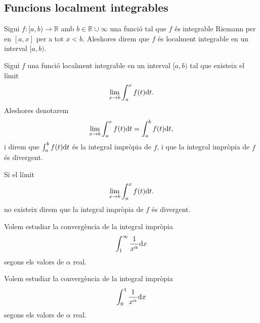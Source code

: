 \documentclass[../Apunts.tex]{subfiles}
\begin{document}
	\subsection{Funcions localment integrables}
	\begin{definition}
		\label{def:funció localment integrable}
		Sigui \(f\colon[a,b)\longrightarrow\mathbb{R}\) amb \(b\in\mathbb{R}\cup\infty\) una funció tal que \(f\) és integrable Riemann per en \([a,x]\) per a tot \(x<b\). Aleshores direm que \(f\) és localment integrable en un interval \([a,b)\).
	\end{definition}
	\begin{definition}
		\label{def:integral impròpia}
		\label{def:integral impròpia convergent}
		\label{def:integral impròpia divergent}
		Sigui \(f\) una funció localment integrable en un interval \([a,b)\) tal que existeix el límit
		\[\lim_{x\to b}\int_{a}^{x}f(t)\mathrm{d} t.\]
		Aleshores denotarem
		\[\lim_{x\to b}\int_{a}^{x}f(t)\mathrm{d} t=\int_{a}^{b}f(t)\mathrm{d} t,\]
		i direm que \(\int_{a}^{b}f(t)\mathrm{d} t\) és la integral impròpia de \(f\), i que la integral impròpia de \(f\) és divergent.
		
		Si el límit
		\[\lim_{x\to b}\int_{a}^{x}f(t)\mathrm{d} t.\]
		no existeix direm que la integral impròpia de \(f\) és divergent.
	\end{definition}
	\begin{example}
		\label{ex:funció de la sèrie harmònica en integrals impròpies entre 1 i infinit}
		Volem estudiar la convergència de la integral impròpia
		\[\int_{1}^{\infty}\frac{1}{x^{\alpha}}\mathrm{d} x\]
		segons els valors de \(\alpha\) real.
		\begin{solution}
		\end{solution}
	\end{example}
	\begin{example}
		\label{ex:funció de la sèrie harmònica en integrals impròpies entre 0 i 1}
		Volem estudiar la convergència de la integral impròpia
		\[\int_{0}^{1}\frac{1}{x^{\alpha}}\mathrm{d} x\]
		segons els valors de \(\alpha\) real.
		\begin{solution}
		\end{solution}
	\end{example}
\end{document}
